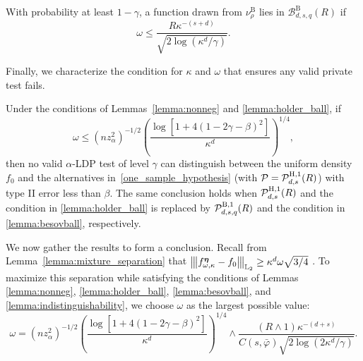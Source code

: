 \documentclass[twoside,11pt]{article}
\newcommand{\distClassGeneric}{\mathcal{P}}
\newcommand{\vertiii}[1]{
	{\left\vert\kern-0.25ex\left\vert\kern-0.25ex\left\vert #1 
		\right\vert\kern-0.25ex\right\vert\kern-0.25ex\right\vert}
}%
\newcommand{\dimDensity}{d} %
\newcommand{\smoothness}{s}
\newcommand{\ballRadius}{R}
\newcommand{\privacyParameter}{\alpha} %
\newcommand{\maxErrorTypeOne}{\gamma} %
\newcommand{\binNum}{\kappa}           %
\newcommand{\besovParamMicroscope}{q}
\newcommand{\ballDistn}{\mathcal{B}}
\newcommand{\besovBall}[2]{\ballDistn_{\dimDensity,\smoothness, #2}^{\mathrm{B}}(\ballRadius)}
\newcommand{\pBesovGof}{ %
	\distClassGeneric_{%
		\dimDensity, \smoothness, \besovParamMicroscope
	}^{%
		\mathrm{B,1}
	}
	(\ballRadius)
}
\newcommand{\pHolderGof}{ %
	\distClassGeneric_{%
		\dimDensity, \smoothness
	}^{%
		\mathrm{H,1}
	}
	(\ballRadius)
}
\begin{document}
\begin{appendix}
	\begin{lemma}\label{lemma:besovball}
		With probability at least $1-\maxErrorTypeOne$,
		a function drawn from  $\nu_\rho^{}$ lies in $\besovBall{}{\besovParamMicroscope}$ if 
		\begin{equation}
			\omega \leq
			\frac{\ballRadius \binNum^{-(\smoothness + \dimDensity)}}{
				\sqrt{
					2\log(\binNum^\dimDensity/\maxErrorTypeOne)
				}
			}.
		\end{equation}
	\end{lemma}
	Finally, we characterize the condition for $\binNum$ and $\omega$ that ensures any valid private test fails.
	\begin{lemma}[Indistinguishability]\label{lemma:indistinguishability}
		Under the conditions of Lemmas~\ref{lemma:nonneg} and \ref{lemma:holder_ball}, if \begin{equation} \label{eq:two_sample_lower_bound_main_suff_1}
			\omega
			\leq
			(n z_\privacyParameter^2)^{-1/2}
			\left(
			\frac{\log \left[ 1 + 4(1- 2\gamma - \beta)^2\right]}{\binNum^{\dimDensity}}
			\right)^{1/4},
		\end{equation} 
		then no valid $\privacyParameter$-LDP test of level $\gamma$ can distinguish between the uniform density $f_0$ and the alternatives in~\eqref{one_sample_hypothesis} (with $\distClassGeneric = \pHolderGof$) with type II error less than $\beta$. The same conclusion holds when $\pHolderGof$ and the condition in \ref{lemma:holder_ball} is replaced by $\pBesovGof$ and the condition in \ref{lemma:besovball}, respectively. \end{lemma}
	We now gather the results to form a conclusion.
	Recall from Lemma~\ref{lemma:mixture_separation} that $\vertiii{ f^{{\boldsymbol{\eta}}}_{\omega, \binNum}- f_0}_{_2}
	\geq
	\binNum^{\dimDensity} \omega {}$ .
	To maximize this separation while satisfying the conditions of Lemmas \ref{lemma:nonneg}, \ref{lemma:holder_ball}, \ref{lemma:besovball}, and \ref{lemma:indistinguishability}, we choose $\omega$ as the largest possible value:
	\begin{equation*}
		\omega 
		= 
		(n z_\privacyParameter^2)^{-1/2}
		\left(
		\frac{\log \left[ 1 + 4(1- 2\gamma - \beta)^2\right]}{\binNum^{\dimDensity}}
		\right)^{1/4}
		\wedge
		\frac{(R \wedge 1)\kappa^{-(\dimDensity + \smoothness)}
		}{
			C(\smoothness, \bar{\varphi}) 
			\sqrt{2 \log({2 \binNum^{\dimDensity}}/\gamma)}}.

\end{equation*}
\end{appendix}
\end{document}
